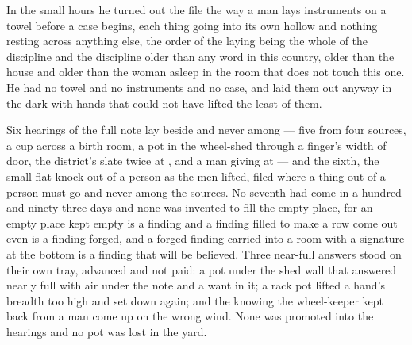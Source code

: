 \scenebreak

In the small hours he turned out the file the way a man lays instruments on a towel before a case begins, each thing going into its own hollow and nothing resting across anything else, the order of the laying being the whole of the discipline and the discipline older than any word in this country, older than the house and older than the woman asleep in the room that does not touch this one. He had no towel and no instruments and no case, and laid them out anyway in the dark with hands that could not have lifted the least of them.

Six hearings of the full note lay beside and never among --- five from four sources, a cup across a birth room, a pot in the wheel-shed through a finger's width of door, the district's slate twice at , and a man giving at  --- and the sixth, the small flat knock out of a person as the men lifted, filed where a thing out of a person must go and never among the sources. No seventh had come in a hundred and ninety-three days and none was invented to fill the empty place, for an empty place kept empty is a finding and a finding filled to make a row come out even is a finding forged, and a forged finding carried into a room with a signature at the bottom is a finding that will be believed. Three near-full answers stood on their own tray, advanced and not paid: a pot under the shed wall that answered nearly full with air under the note and a want in it; a rack pot lifted a hand's breadth too high and set down again; and the knowing the wheel-keeper kept back from a man come up on the wrong wind. None was promoted into the hearings and no pot was lost in the yard.

